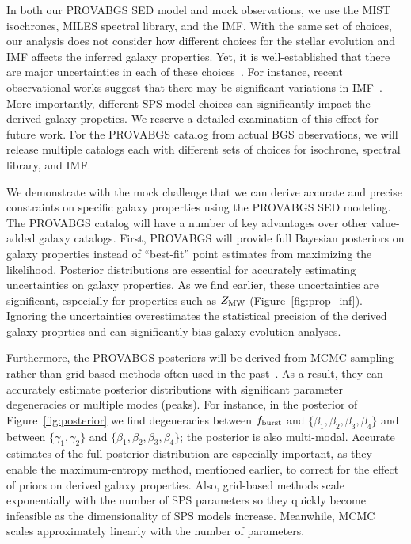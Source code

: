 In both our {\sc PROVABGS} SED model and mock observations, we use the MIST
isochrones, MILES spectral library, and the \cite{chabrier2003} IMF.
With the same set of choices, our analysis does not consider how different
choices for the stellar evolution and IMF affects the inferred galaxy properties. 
Yet, it is well-established that there are major uncertainties in each of these
choices~\citep{conroy2009, conroy2013}.
For instance, recent observational works suggest that there may be significant
variations in IMF~\citep[\emph{e.g.}][]{treu2010, vandokkum2010, rosani2018,
sonnenfeld2019}. 
More importantly, different SPS model choices can significantly impact the
derived galaxy propeties.
We reserve a detailed examination of this effect for future work. 
For the {\sc PROVABGS} catalog from actual BGS observations, we will release
multiple catalogs each with different sets of choices for isochrone, spectral
library, and IMF.

We demonstrate with the mock challenge that we can derive accurate and precise
constraints on specific galaxy properties using the {\sc PROVABGS} SED modeling. 
The {\sc PROVABGS} catalog will have a number of key advantages over other
value-added galaxy catalogs. 
First, {\sc PROVABGS} will provide full Bayesian posteriors on galaxy
properties instead of ``best-fit'' point estimates from maximizing the
likelihood. 
Posterior distributions are essential for accurately estimating uncertainties
on galaxy properties.  
As we find earlier, these uncertainties are significant, especially for
properties such as $Z_{\rm MW}$ (Figure~\ref{fig:prop_inf}). 
Ignoring the uncertainties overestimates the statistical precision of the
derived galaxy proprties and can significantly bias galaxy evolution analyses.

Furthermore, the {\sc PROVABGS} posteriors will be derived from MCMC sampling
rather than grid-based methods often used in the
past~\citep[\emph{e.g.}][]{dacunha2008, moustakas2013, boquien2019}.
As a result, they can accurately estimate posterior distributions with
significant parameter degeneracies or multiple modes (peaks). 
For instance, in the posterior of Figure~\ref{fig:posterior} we find
degeneracies between $f_{\rm burst}$ and $\{\beta_1, \beta_2, \beta_3,
\beta_4\}$ and between $\{\gamma_1, \gamma_2\}$ and $\{\beta_1, \beta_2,
\beta_3, \beta_4\}$; the posterior is also multi-modal. 
Accurate estimates of the full posterior distribution are especially important,
as they enable the maximum-entropy method, mentioned earlier, 
to correct for the effect of priors on derived galaxy properties.
Also, grid-based methods scale exponentially with the number of SPS parameters
so they quickly become infeasible as the dimensionality of SPS models increase.  
Meanwhile, MCMC scales approximately linearly with the number of parameters. 

